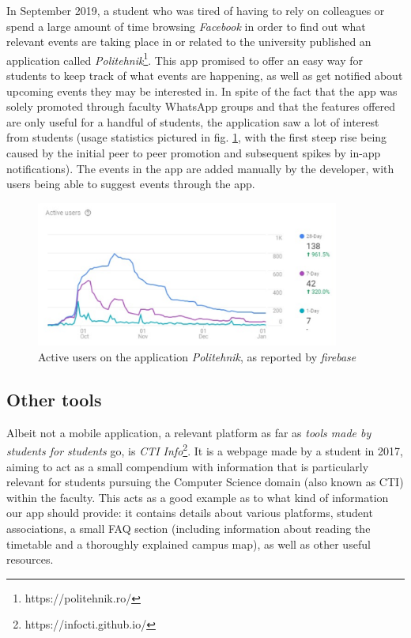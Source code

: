     In September 2019, a student who was tired of having to rely on colleagues or spend a large amount of time browsing \textit{Facebook} in order to find out what relevant events are taking place in or related to the university published an application called \textit{Politehnik}\footnote{https://politehnik.ro/}. This app promised to offer an easy way for students to keep track of what events are happening, as well as get notified about upcoming events they may be interested in. In spite of the fact that the app was solely promoted through faculty WhatsApp groups and that the features offered are only useful for a handful of students, the application saw a lot of interest from students (usage statistics pictured in fig. \ref{2:fig:politehnik_usage}, with the first steep rise being caused by the initial peer to peer promotion and subsequent spikes by in-app notifications). The events in the app are added manually by the developer, with users being able to suggest events through the app.
    
    \begin{figure}[ht]
        \centering
             \includegraphics[width=0.89\textwidth]{figures/charts/politehnik_usage.png}
        \caption{Active users on the application \textit{Politehnik}, as reported by \textit{\gls{firebase}}}
        \label{2:fig:politehnik_usage}
    \end{figure}
    
    \subsection{Other tools} \label{2:existing_apps_other}
    Albeit not a mobile application, a relevant platform as far as \textit{tools made by students for students} go, is \textit{CTI Info}\footnote{https://infocti.github.io/}. It is a webpage made by a student in 2017, aiming to act as a small compendium with information that is particularly relevant for students pursuing the Computer Science domain (also known as CTI) within the faculty. This acts as a good example as to what kind of information our app should provide: it contains details about various platforms, student associations, a small FAQ section (including information about reading the timetable and a thoroughly explained campus map), as well as other useful resources.

